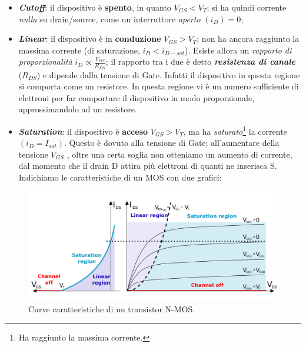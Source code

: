 \documentclass[
]{book}
\providecommand{\tightlist}{%
  \setlength{\itemsep}{0pt}\setlength{\parskip}{0pt}}
\begin{document}
\begin{itemize}
\tightlist
\item
  \textbf{\emph{Cutoff}}: il dispositivo è \textbf{spento}, in quanto
  \(V_{GS}<V_T\); si ha quindi corrente \emph{nulla} su drain/source,
  come un interruttore \emph{aperto} \((i_D)=0\);
\item
  \textbf{\emph{Linear}}: il dispositivo è in \textbf{conduzione}
  \(V_{GS}>V_T\); non ha ancora raggiunto la massima corrente (di
  saturazione, \(i_D<i_{D-sat}\)). Esiste allora un \emph{rapporto di
  proporzionalità} \(i_D \propto \frac{V_{DS}}{R_{DS}}\); il rapporto
  tra i due è detto \textbf{\emph{resistenza di canale}} (\(R_{DS}\)) e
  dipende dalla tensione di Gate. Infatti il dispositivo in questa
  regione si comporta come un resistore. In questa regione vi è un
  numero sufficiente di elettroni per far comportare il dispositivo in
  modo proporzionale, approssimandolo ad un resistore.
\item
  \textbf{\emph{Saturation}}: il dispositivo è \textbf{acceso}
  \(V_{GS}>V_T\), ma ha \emph{saturato}\footnote{Ha raggiunto la massima
    corrente.} la corrente \((i_D=I_{sat})\). Questo è dovuto alla
  tensione di Gate; all'aumentare della tensione \(V_{GS}\) , oltre una
  certa soglia non otteniamo un aumento di corrente, dal momento che il
  drain D attira più elettroni di quanti ne inserisca S. Indichiamo le
  caratteristiche di un MOS con due grafici:
\end{itemize}

\begin{figure}
\centering
\includegraphics[width=0.65\linewidth,height=\textheight,keepaspectratio]{assets/imgs/caratteristiche_NMOS.png}
\caption{Curve caratteristiche di un transistor N-MOS.}
\end{figure}
\end{document}
